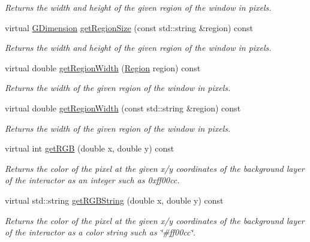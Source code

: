 \begin{DoxyCompactItemize}
\begin{DoxyCompactList}\small\item\em Returns the width and height of the given region of the window in pixels. \end{DoxyCompactList}\item 
virtual \mbox{\hyperlink{classGDimension}{G\+Dimension}} \mbox{\hyperlink{classGWindow_a68b18b38b72cb8779fca0c3882549a6b}{get\+Region\+Size}} (const std\+::string \&region) const
\begin{DoxyCompactList}\small\item\em Returns the width and height of the given region of the window in pixels. \end{DoxyCompactList}\item 
virtual double \mbox{\hyperlink{classGWindow_a96e2005c3f447a8679c3c32d3fc02de1}{get\+Region\+Width}} (\mbox{\hyperlink{classGWindow_a81a01a86de31071a92e6cce0bab9bc4b}{Region}} region) const
\begin{DoxyCompactList}\small\item\em Returns the width of the given region of the window in pixels. \end{DoxyCompactList}\item 
virtual double \mbox{\hyperlink{classGWindow_ab169dab454fc90f1c845b91b4e1a8a14}{get\+Region\+Width}} (const std\+::string \&region) const
\begin{DoxyCompactList}\small\item\em Returns the width of the given region of the window in pixels. \end{DoxyCompactList}\item 
virtual int \mbox{\hyperlink{classGDrawingSurface_a9e983467cf0c97cfd62433a8471570dc}{get\+R\+GB}} (double x, double y) const
\begin{DoxyCompactList}\small\item\em Returns the color of the pixel at the given x/y coordinates of the background layer of the interactor as an integer such as 0xff00cc. \end{DoxyCompactList}\item 
virtual std\+::string \mbox{\hyperlink{classGDrawingSurface_a456d3582acc3544f37d939f5cb8802fe}{get\+R\+G\+B\+String}} (double x, double y) const
\begin{DoxyCompactList}\small\item\em Returns the color of the pixel at the given x/y coordinates of the background layer of the interactor as a color string such as \char`\"{}\#ff00cc\char`\"{}. \end{DoxyCompactList}\item 

\end{DoxyCompactItemize}
